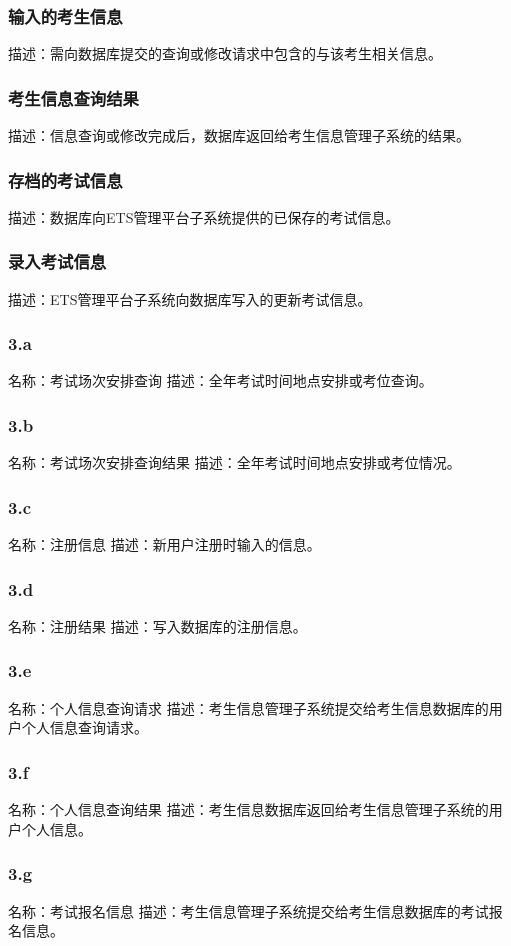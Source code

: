 \subsubsection{输入的考生信息}
描述：需向数据库提交的查询或修改请求中包含的与该考生相关信息。
\subsubsection{考生信息查询结果}
描述：信息查询或修改完成后，数据库返回给考生信息管理子系统的结果。
\subsubsection{存档的考试信息}
描述：数据库向ETS管理平台子系统提供的已保存的考试信息。
\subsubsection{录入考试信息}
描述：ETS管理平台子系统向数据库写入的更新考试信息。
\subsubsection{3.a}
名称：考试场次安排查询
描述：全年考试时间地点安排或考位查询。
\subsubsection{3.b}
名称：考试场次安排查询结果
描述：全年考试时间地点安排或考位情况。
\subsubsection{3.c}
名称：注册信息
描述：新用户注册时输入的信息。
\subsubsection{3.d}
名称：注册结果
描述：写入数据库的注册信息。
\subsubsection{3.e}
名称：个人信息查询请求
描述：考生信息管理子系统提交给考生信息数据库的用户个人信息查询请求。
\subsubsection{3.f}
名称：个人信息查询结果
描述：考生信息数据库返回给考生信息管理子系统的用户个人信息。
\subsubsection{3.g}
名称：考试报名信息
描述：考生信息管理子系统提交给考生信息数据库的考试报名信息。
